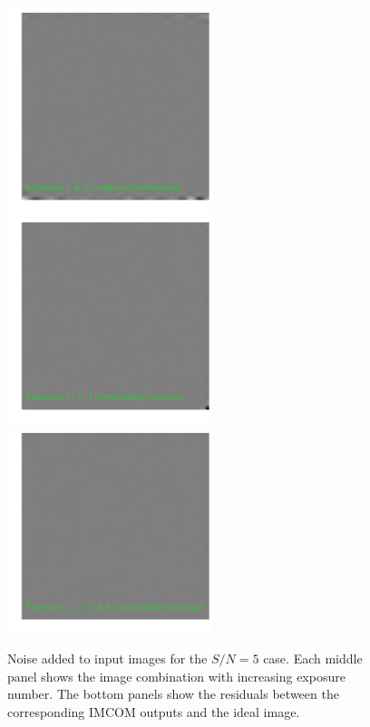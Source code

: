 \documentclass[12pt,preprint]{aastex6}
\begin{document}
\begin{figure}[!htbp]
\includegraphics[height=60mm,width=60mm]{f5e.png}
\includegraphics[height=60mm,width=60mm]{f5f.png}
\includegraphics[height=60mm,width=60mm]{f5g.png}
\caption{Noise added to input images for the $S/N=5$ case. Each middle panel shows the image combination with increasing exposure number. The bottom panels show the residuals between the corresponding IMCOM outputs and the ideal image.}
\label{fig:noise_by_exp}
\end{figure}
\end{document}
